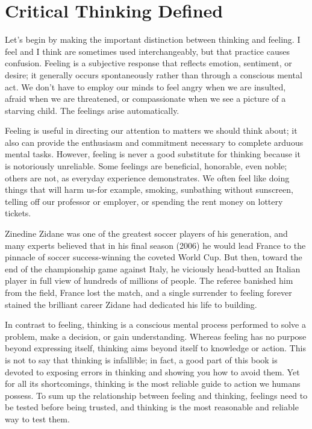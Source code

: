 \documentclass{book}
\begin{document}
\section{Critical Thinking Defined}

Let’s begin by making the important distinction between thinking and feeling. I feel and I think are sometimes used interchangeably, but that practice causes confusion. Feeling is a subjective response that reflects emotion, sentiment, or desire; it generally occurs spontaneously rather than through a conscious mental act. We don’t have to employ our minds to feel angry when we are insulted, afraid when we are threatened, or compassionate when we see a picture of a starving child. The feelings arise automatically.

Feeling is useful in directing our attention to matters we should think about; it also can provide the enthusiasm and commitment necessary to complete arduous mental tasks. However, feeling is never a good substitute for thinking because it is notoriously unreliable. Some feelings are beneficial, honorable, even noble; others are not, as everyday experience demonstrates. We often feel like doing things that will harm us-for example, smoking, sunbathing without sunscreen, telling off our professor or employer, or spending the rent money on lottery tickets.

Zinedine Zidane was one of the greatest soccer players of his generation, and many experts believed that in his final season (2006) he would lead France to the pinnacle of soccer success-winning the coveted World Cup. But then, toward the end of the championship game against Italy, he viciously head-butted an Italian player in full view of hundreds of millions of people. The referee banished him from the field, France lost the match, and a single surrender to feeling forever stained the brilliant career Zidane had dedicated his life to building.

In contrast to feeling, thinking is a conscious mental process performed to solve a problem, make a decision, or gain understanding. Whereas feeling has no purpose beyond expressing itself, thinking aims beyond itself to knowledge or action. This is not to say that thinking is infallible; in fact, a good part of this book is devoted to exposing errors in thinking and showing you how to avoid them. Yet for all its shortcomings, thinking is the most reliable guide to action we humans possess. To sum up the relationship between feeling and thinking, feelings need to be tested before being trusted, and thinking is the most reasonable and reliable way to test them.
\end{document}

